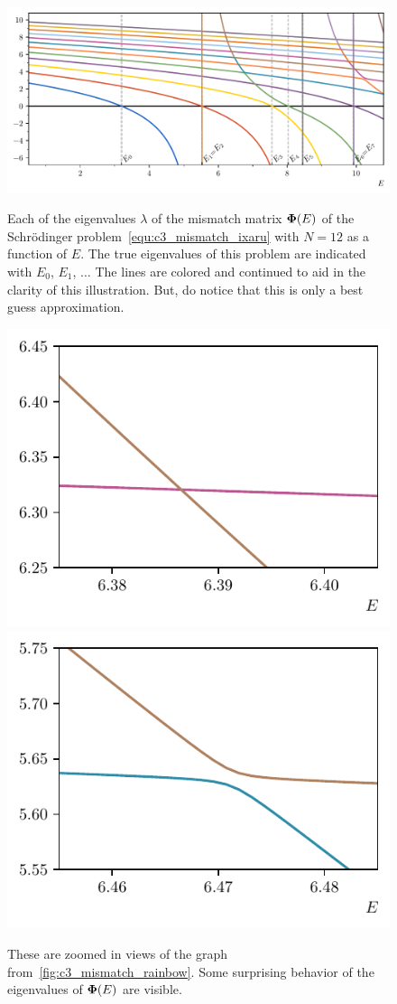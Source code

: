 \begin{figure}
  \begin{center}
    \includegraphics[width=\textwidth]{img/chapter3/mismatch_rainbow.pdf}
  \end{center}
  \caption{Each of the eigenvalues $\lambda$ of the mismatch matrix $\vb{\Phi}(E)$ of the Schrödinger problem~\eqref{equ:c3_mismatch_ixaru} with $N = 12$ as a function of $E$. The true eigenvalues of this problem are indicated with $E_0$, $E_1$, $\dots$ The lines are colored and continued to aid in the clarity of this illustration. But, do notice that this is only a best guess approximation.}\label{fig:c3_mismatch_rainbow}
  \vspace{1cm}
  \begin{center}
    \includegraphics[width=.495\textwidth]{img/chapter3/mismatch_rainbow_zoomed_0.pdf}
    \hfill
    \includegraphics[width=.495\textwidth]{img/chapter3/mismatch_rainbow_zoomed_1.pdf}
  \end{center}
  \caption{These are zoomed in views of the graph from~\ref{fig:c3_mismatch_rainbow}. Some surprising behavior of the eigenvalues of $\vb{\Phi}(E)$ are visible.}\label{fig:c3_mismatch_rainbow_zoom}
\end{figure}

